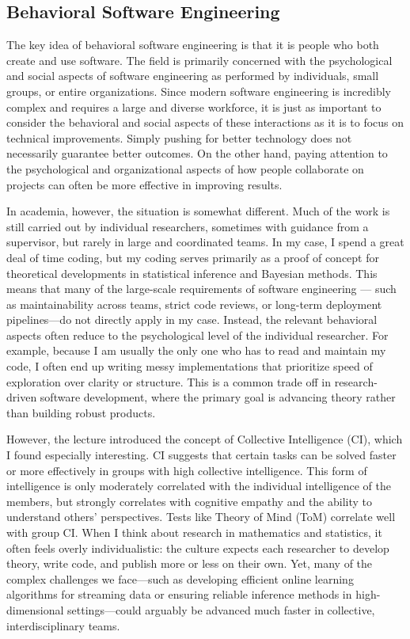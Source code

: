 \documentclass[11pt,a4paper]{article}
\begin{document}
\subsection{Behavioral Software Engineering}
The key idea of behavioral software engineering is that it is people who both create and use software. The field is primarily concerned with the psychological and social aspects of software engineering as performed by individuals, small groups, or entire organizations. Since modern software engineering is incredibly complex and requires a large and diverse workforce, it is just as important to consider the behavioral and social aspects of these interactions as it is to focus on technical improvements. Simply pushing for better technology does not necessarily guarantee better outcomes. On the other hand, paying attention to the psychological and organizational aspects of how people collaborate on projects can often be more effective in improving results.

In academia, however, the situation is somewhat different. Much of the work is still carried out by individual researchers, sometimes with guidance from a supervisor, but rarely in large and coordinated teams. In my case, I spend a great deal of time coding, but my coding serves primarily as a proof of concept for theoretical developments in statistical inference and Bayesian methods. This means that many of the large-scale requirements of software engineering — such as maintainability across teams, strict code reviews, or long-term deployment pipelines—do not directly apply in my case. Instead, the relevant behavioral aspects often reduce to the psychological level of the individual researcher. For example, because I am usually the only one who has to read and maintain my code, I often end up writing messy implementations that prioritize speed of exploration over clarity or structure. This is a common trade off in research-driven software development, where the primary goal is advancing theory rather than building robust products. 

However, the lecture introduced the concept of Collective Intelligence (CI), which I found especially interesting. CI suggests that certain tasks can be solved faster or more effectively in groups with high collective intelligence. This form of intelligence is only moderately correlated with the individual intelligence of the members, but strongly correlates with cognitive empathy and the ability to understand others’ perspectives. Tests like Theory of Mind (ToM) correlate well with group CI. When I think about research in mathematics and statistics, it often feels overly individualistic: the culture expects each researcher to develop theory, write code, and publish more or less on their own. Yet, many of the complex challenges we face—such as developing efficient online learning algorithms for streaming data or ensuring reliable inference methods in high-dimensional settings—could arguably be advanced much faster in collective, interdisciplinary teams.
\end{document}
